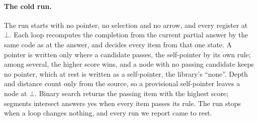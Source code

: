 \documentclass[10pt]{article}
\newcommand{\notyet}{\bot}
\begin{document}
\paragraph{The cold run.} The run starts with no pointer, no selection and no arrow, and every register at $\notyet$.
Each loop recomputes the completion from the current partial answer by the same code as at the answer, and decides every
item from that one state. A pointer is written only where a candidate passes, the self-pointer by its own rule; among
several, the higher score wins, and a node with no passing candidate keeps no pointer, which at rest is written as a
self-pointer, the library's ``none''. Depth and distance count only from the source, so a provisional self-pointer
leaves a node at $\notyet$. Binary search returns the passing item with the highest score; segments intersect answers
yes when every item passes its rule. The run stops when a loop changes nothing, and every run we report came to rest.
\end{document}
